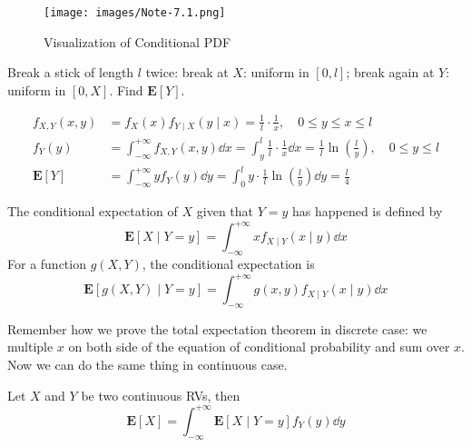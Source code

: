 \documentclass[device=normal, lang=en]{elegantbook}
\numberwithin{equation}{section}
\begin{document}
\begin{figure}[H]
    \centering
    \texttt{[image: images/Note-7.1.png]}
    \caption{Visualization of Conditional PDF}
\end{figure}

\begin{example}
    Break a stick of length $l$ twice: break at $X$: uniform in $[0, l]$; break again at $Y$: uniform in $[0, X]$. Find $\mathbf{E}[Y]$. 
    \begin{solution}
        \begin{align}
            f_{X, Y}(x, y) &= f_{X}(x) f_{Y \mid X}(y \mid x) = \frac{1}{l} \cdot \frac{1}{x}, \quad 0 \leq y \leq x \leq l \\ 
            f_{Y}(y) &= \int_{-\infty}^{+\infty} f_{X, Y}(x, y) \dd{x} = \int_{y}^{l} \frac{1}{l} \cdot \frac{1}{x} \dd{x} = \frac{1}{l} \ln\left(\frac{l}{y}\right), \quad 0 \leq y \leq l \\ 
            \mathbf{E}[Y] &= \int_{-\infty}^{+\infty} y f_{Y}(y) \dd{y} = \int_{0}^{l} y \cdot \frac{1}{l} \ln\left(\frac{l}{y}\right) \dd{y} = \frac{l}{4}
        \end{align}
    \end{solution}
\end{example}

\begin{definition}
    The conditional expectation of $X$ given that $Y = y$ has happened is defined by
    \begin{equation}
        \mathbf{E}[X \mid Y = y] = \int_{-\infty}^{+\infty} x f_{X \mid Y}(x \mid y) \dd{x}
    \end{equation}
    For a function $g(X, Y)$, the conditional expectation is 
    \begin{equation}
        \mathbf{E}[g(X, Y) \mid Y = y] = \int_{-\infty}^{+\infty} g(x, y) f_{X \mid Y}(x \mid y) \dd{x}
    \end{equation}
\end{definition}

Remember how we prove the total expectation theorem in discrete case: we multiple $x$ on both side of the equation of conditional probability and sum over $x$. Now we can do the same thing in continuous case.
\begin{theorem}
    Let $X$ and $Y$ be two continuous RVs, then
    \begin{equation}
        \mathbf{E}[X] = \int_{-\infty}^{+\infty} \mathbf{E}[X \mid Y = y] f_{Y}(y) \dd{y}
    \end{equation}
\end{theorem}


\appendix

\end{document}

